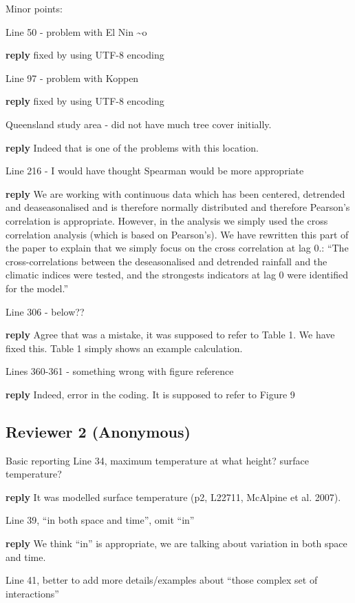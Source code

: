 \documentclass[fleqn,10pt,lineno]{wlpeerj} %
\theoremstyle{definition}
\theoremstyle{definition}
\theoremstyle{definition}
\theoremstyle{remark}
\begin{document}
Minor points:

Line 50 - problem with El Nin \textasciitilde{}o

\textbf{reply} fixed by using UTF-8 encoding

Line 97 - problem with Koppen

\textbf{reply} fixed by using UTF-8 encoding

Queensland study area - did not have much tree cover initially.

\textbf{reply} Indeed that is one of the problems with this location.

Line 216 - I would have thought Spearman would be more appropriate

\textbf{reply} We are working with continuous data which has been
centered, detrended and deaseasonalised and is therefore normally
distributed and therefore Pearson's correlation is appropriate. However,
in the analysis we simply used the cross correlation analysis (which is
based on Pearson's). We have rewritten this part of the paper to explain
that we simply focus on the cross correlation at lag 0.: ``The
cross-correlations between the deseasonalised and detrended rainfall and
the climatic indices were tested, and the strongests indicators at lag 0
were identified for the model.''

Line 306 - below??

\textbf{reply} Agree that was a mistake, it was supposed to refer to
Table 1. We have fixed this. Table 1 simply shows an example
calculation.

Lines 360-361 - something wrong with figure reference

\textbf{reply} Indeed, error in the coding. It is supposed to refer to
Figure 9

\subsection{Reviewer 2 (Anonymous)}\label{reviewer-2-anonymous}

Basic reporting Line 34, maximum temperature at what height? surface
temperature?

\textbf{reply} It was modelled surface temperature (p2, L22711, McAlpine
et al. 2007).

Line 39, ``in both space and time'', omit ``in''

\textbf{reply} We think ``in'' is appropriate, we are talking about
variation in both space and time.

Line 41, better to add more details/examples about ``those complex set
of interactions''
\end{document}
